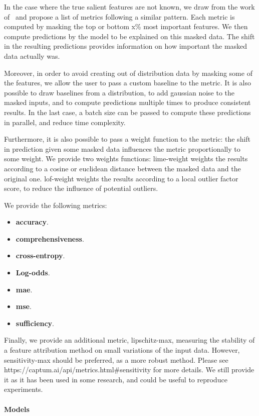 In the case where the true salient features are not known, we draw from the work
of~\citep{shrikumar2017learning,deyoung2019eraser,crabbe2021explaining} and propose a list of metrics following a
similar pattern.
Each metric is computed by masking the top or bottom x\% most important features.
We then compute predictions by the model to be explained on this masked data.
The shift in the resulting predictions provides information on how important the masked data actually was.

Moreover, in order to avoid creating out of distribution data by masking some of the features, we allow the user to
pass a custom baseline to the metric.
It is also possible to draw baselines from a distribution, to add gaussian noise to the masked inputs, and to compute
predictions multiple times to produce consistent results.
In the last case, a batch size can be passed to compute these predictions in parallel, and reduce time complexity.

Furthermore, it is also possible to pass a weight function to the metric: the shift in prediction given some masked
data influences the metric proportionally to some weight.
We provide two weights functions: lime-weight weights the results according to a cosine or euclidean distance between
the masked data and the original one.
lof-weight weights the results according to a local outlier factor score, to reduce the influence of potential outliers.

We provide the following metrics:

\begin{itemize}
    \item \textbf{accuracy}.

    \item \textbf{comprehensiveness}.
    \item \textbf{cross-entropy}.
    \item \textbf{Log-odds}.
    \item \textbf{mae}.
    \item \textbf{mse}.
    \item \textbf{sufficiency}.
\end{itemize}

Finally, we provide an additional metric, lipschitz-max, measuring the stability of a feature attribution method
on small variations of the input data.
However, sensitivity-max should be preferred, as a more robust method.
Please see https://captum.ai/api/metrics.html#sensitivity for more details.
We still provide it as it has been used in some research, and could be useful to reproduce experiments.


\paragraph{Models}
